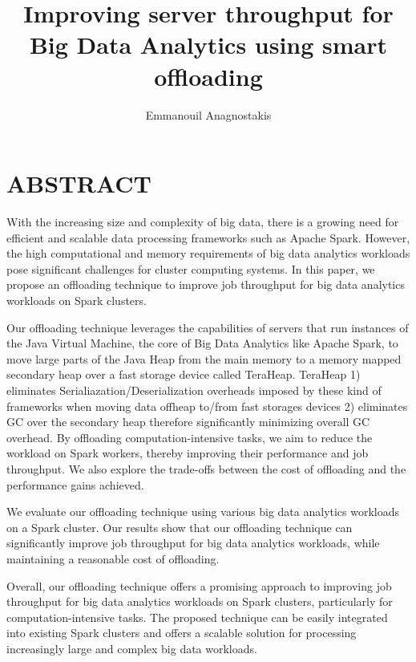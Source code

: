 \documentclass[twocolumn,10pt]{asme2e}
\title{Improving server throughput for Big Data Analytics using smart offloading}
\author{Emmanouil Anagnostakis
    \affiliation{
	    Graduate Research Assistant\\
	    Computer Architecture and VLSI Systems Laboratory, ICS-FORTH\\
	    Heraklion, Greece\\
      manosanag@ics.forth.gr
    }	
}
\begin{document}
\maketitle    

\section*{ABSTRACT}

With the increasing size and complexity of big data, there is a growing need for efficient and scalable data processing frameworks such as Apache Spark. However, the high computational and memory requirements of big data analytics workloads pose significant challenges for cluster computing systems. In this paper, we propose an offloading technique to improve job throughput for big data analytics workloads on Spark clusters.

Our offloading technique leverages the capabilities of servers that run instances of the Java Virtual Machine, the core of Big Data Analytics like Apache Spark, to move large parts of the Java Heap from the main memory to a memory mapped secondary heap over a fast storage device called TeraHeap. TeraHeap 1) eliminates Serialiazation/Deserialization overheads imposed by these kind of frameworks when moving data offheap to/from fast storages devices 2) eliminates GC over the secondary heap therefore significantly minimizing overall GC overhead. By offloading computation-intensive tasks, we aim to reduce the workload on Spark workers, thereby improving their performance and job throughput. We also explore the trade-offs between the cost of offloading and the performance gains achieved.

We evaluate our offloading technique using various big data analytics workloads on a Spark cluster. Our results show that our offloading technique can significantly improve job throughput for big data analytics workloads, while maintaining a reasonable cost of offloading.

\par Overall, our offloading technique offers a promising approach to improving job throughput for big data analytics workloads on Spark clusters, particularly for computation-intensive tasks. The proposed technique can be easily integrated into existing Spark clusters and offers a scalable solution for processing increasingly large and complex big data workloads.

\end{document}
